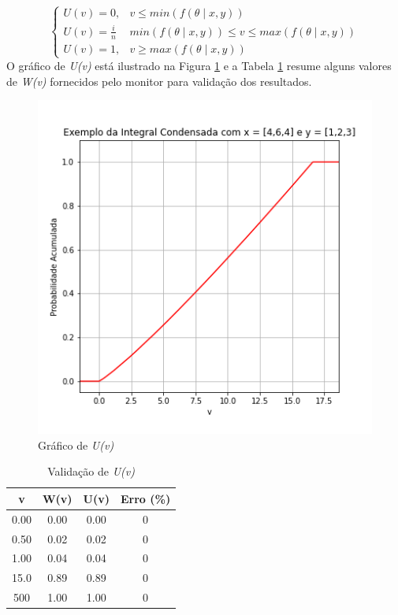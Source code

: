 \documentclass{article}
\begin{document}
\begin{equation}
    \left\{\begin{matrix}
    U(v)= 0, & v \leq min(f(\theta\mid x,y))\\ 
    U(v)= \frac{i}{n} & min(f(\theta\mid x,y)) \leq v \leq max(f(\theta\mid x,y))\\ 
    U(v)= 1, & v \geq max(f(\theta\mid x,y))
    \end{matrix}\right.
\end{equation}
\linebreak
O gráfico de \textit{U(v)} está ilustrado na Figura \ref{fig:int} e a Tabela \ref{tab:validation} resume alguns valores de \textit{W(v)} fornecidos pelo monitor para validação dos resultados.

\begin{figure}[htp]
  \centering
  \includegraphics[scale=0.85]{Imagens/Integral.png}
  \caption{Gráfico de \textit{U(v)}}
  \label{fig:int}
\end{figure}

\begin{table}[h!]
\centering
 \begin{tabular}{||c c c c||} 
 \hline
 v & W(v) & U(v) & Erro (\%) \\ [0.5ex] 
 \hline\hline
 0.00 & 0.00 & 0.00 & 0 \\ 
 0.50 & 0.02 & 0.02 & 0 \\
 1.00 & 0.04 & 0.04 & 0 \\
 15.0 & 0.89 & 0.89 & 0 \\
 500 & 1.00 & 1.00 & 0 \\ [1ex] 
 \hline
 \end{tabular}
 \caption{Validação de \textit{U(v)}}
 \label{tab:validation}
\end{table}
\end{document}
